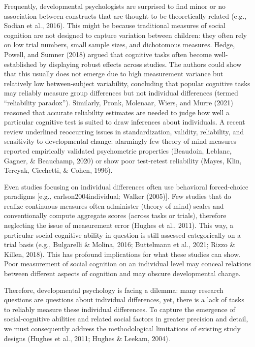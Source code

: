 \documentclass[
  man,floatsintext]{apa6}
\begin{document}
Frequently, developmental psychologists are surprised to find minor or no association between constructs that are thought to be theoretically related (e.g., Sodian et al., 2016).
This might be because traditional measures of social cognition are not designed to capture variation between children:
they often rely on low trial numbers, small sample sizes, and dichotomous measures.
Hedge, Powell, and Sumner (2018) argued that cognitive tasks often become well-established by displaying robust effects across studies.
The authors could show that this usually does not emerge due to high measurement variance but relatively low between-subject variability, concluding that popular cognitive tasks may reliably measure group differences but not individual differences (termed ``reliability paradox'').
Similarly, Pronk, Molenaar, Wiers, and Murre (2021) reasoned that accurate reliability estimates are needed to judge how well a particular cognitive test is suited to draw inferences about individuals.
A recent review underlined reoccurring issues in standardization, validity, reliability, and sensitivity to developmental change: alarmingly few theory of mind measures reported empirically validated psychometric properties (Beaudoin, Leblanc, Gagner, \& Beauchamp, 2020) or show poor test-retest reliability (Mayes, Klin, Tercyak, Cicchetti, \& Cohen, 1996).

Even studies focusing on individual differences often use behavioral forced-choice paradigms {[}e.g., carlson2004individual; Walker (2005){]}.
Few studies that do realize continuous measures often administer (theory of mind) scales and conventionally compute aggregate scores (across tasks or trials), therefore neglecting the issue of measurement error (Hughes et al., 2011).
This way, a particular social-cognitive ability in question is still assessed categorically on a trial basis (e.g., Bulgarelli \& Molina, 2016; Buttelmann et al., 2021; Rizzo \& Killen, 2018).
This has profound implications for what these studies can show.
Poor measurement of social cognition on an individual level may conceal relations between different aspects of cognition and may obscure developmental change.

Therefore, developmental psychology is facing a dilemma: many research questions are questions about individual differences, yet, there is a lack of tasks to reliably measure these individual differences.
To capture the emergence of social-cognitive abilities and related social factors in greater precision and detail, we must consequently address the methodological limitations of existing study designs (Hughes et al., 2011; Hughes \& Leekam, 2004).
\end{document}
